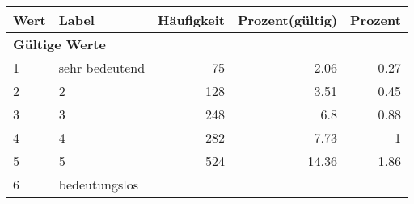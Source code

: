      \begin{longtable}{lXrrr}
     \toprule
     \textbf{Wert} & \textbf{Label} & \textbf{Häufigkeit} & \textbf{Prozent(gültig)} & \textbf{Prozent} \\
     \endhead
     \midrule
     \multicolumn{5}{l}{\textbf{Gültige Werte}}\\

     1 &
     \multicolumn{1}{X}{ sehr bedeutend   } &


       \num{75} &
       \num[round-mode=places,round-precision=2]{2,06} &
         \num[round-mode=places,round-precision=2]{0,27} \\

     2 &
     \multicolumn{1}{X}{ 2   } &


       \num{128} &
       \num[round-mode=places,round-precision=2]{3,51} &
         \num[round-mode=places,round-precision=2]{0,45} \\

     3 &
     \multicolumn{1}{X}{ 3   } &


       \num{248} &
       \num[round-mode=places,round-precision=2]{6,8} &
         \num[round-mode=places,round-precision=2]{0,88} \\

     4 &
     \multicolumn{1}{X}{ 4   } &


       \num{282} &
       \num[round-mode=places,round-precision=2]{7,73} &
         \num[round-mode=places,round-precision=2]{1} \\

     5 &
     \multicolumn{1}{X}{ 5   } &


       \num{524} &
       \num[round-mode=places,round-precision=2]{14,36} &
         \num[round-mode=places,round-precision=2]{1,86} \\

     6 &
     \multicolumn{1}{X}{ bedeutungslos   } &



\end{longtable}
